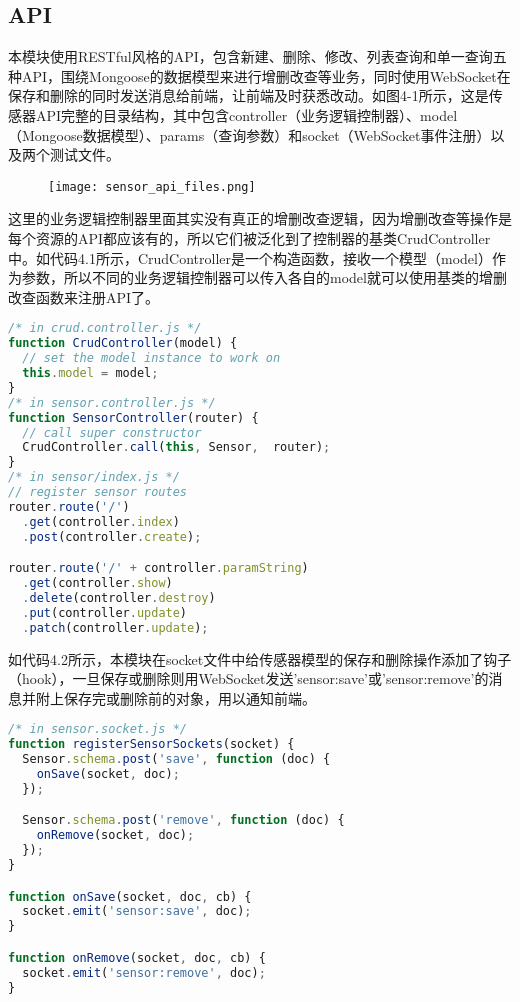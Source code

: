 \subsection{API}
本模块使用RESTful风格的API，包含新建、删除、修改、列表查询和单一查询五种API，围绕Mongoose的数据模型来进行增删改查等业务，同时使用WebSocket在保存和删除的同时发送消息给前端，让前端及时获悉改动。如图4-1所示，这是传感器API完整的目录结构，其中包含controller（业务逻辑控制器）、model（Mongoose数据模型）、params（查询参数）和socket（WebSocket事件注册）以及两个测试文件。
\begin{figure}[H]
 \centering
 \texttt{[image: sensor\_api\_files.png]}
\end{figure}
这里的业务逻辑控制器里面其实没有真正的增删改查逻辑，因为增删改查等操作是每个资源的API都应该有的，所以它们被泛化到了控制器的基类CrudController中。如代码4.1所示，CrudController是一个构造函数，接收一个模型（model）作为参数，所以不同的业务逻辑控制器可以传入各自的model就可以使用基类的增删改查函数来注册API了。
\begin{lstlisting}[language={JavaScript}, caption={传感器API定义}]
/* in crud.controller.js */
function CrudController(model) {
  // set the model instance to work on
  this.model = model;
}
/* in sensor.controller.js */
function SensorController(router) {
  // call super constructor
  CrudController.call(this, Sensor,  router);
}
/* in sensor/index.js */
// register sensor routes
router.route('/')
  .get(controller.index)
  .post(controller.create);

router.route('/' + controller.paramString)
  .get(controller.show)
  .delete(controller.destroy)
  .put(controller.update)
  .patch(controller.update);
\end{lstlisting}

如代码4.2所示，本模块在socket文件中给传感器模型的保存和删除操作添加了钩子（hook），一旦保存或删除则用WebSocket发送'sensor:save'或'sensor:remove'的消息并附上保存完或删除前的对象，用以通知前端。
\begin{lstlisting}[language={JavaScript}, caption={Sensor的Mongoose模型}]
/* in sensor.socket.js */
function registerSensorSockets(socket) {
  Sensor.schema.post('save', function (doc) {
    onSave(socket, doc);
  });

  Sensor.schema.post('remove', function (doc) {
    onRemove(socket, doc);
  });
}

function onSave(socket, doc, cb) {
  socket.emit('sensor:save', doc);
}

function onRemove(socket, doc, cb) {
  socket.emit('sensor:remove', doc);
}
\end{lstlisting}

